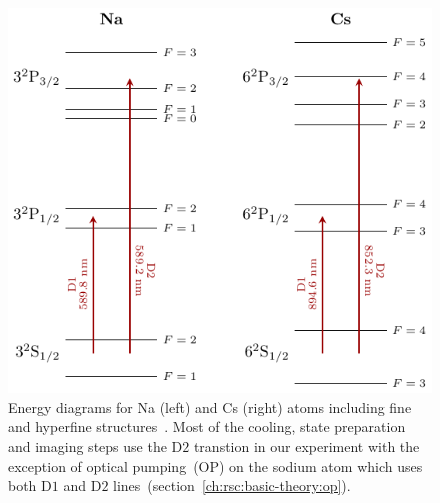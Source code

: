 \begin{figure}
  \centering
  \includegraphics[width=\textwidth]{figures/loading_energy_diagram.pdf}
  \caption[Energy diagrams for Na and Cs atoms]{
    Energy diagrams for Na (left) and Cs (right) atoms
    including fine and hyperfine structures~\cite{steck_sodium_2019,steck_cesium_2019}.
    Most of the cooling, state preparation and imaging steps use the $\mathrm{D2}$ transtion
    in our experiment with the exception of optical pumping~(OP) on the sodium atom
    which uses both $\mathrm{D1}$ and $\mathrm{D2}$ lines~(section~\ref{ch:rsc:basic-theory:op}).
    \label{fig:loading:free-space:energy-diagram}}
\end{figure}

